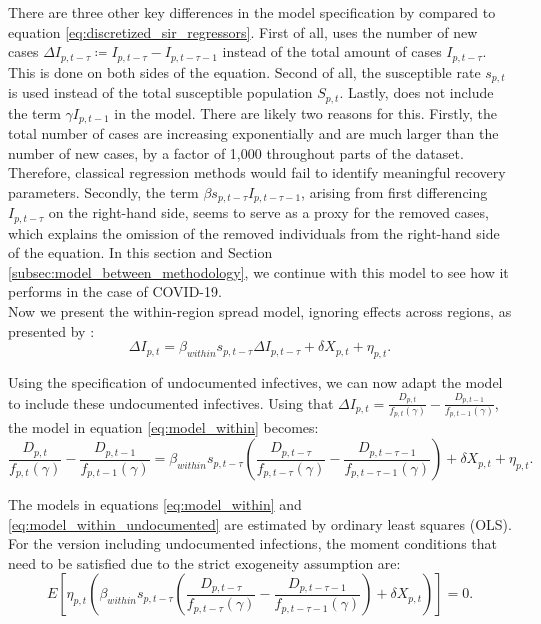 \documentclass[12pt]{article}
\begin{document}
	There are three other key differences in the model specification by \textcite{adda2016economic} compared to equation \eqref{eq:discretized_sir_regressors}. First of all, \textcite{adda2016economic} uses the number of new cases $\Delta I_{p,t-\tau} \coloneqq I_{p,t-\tau} - I_{p,t-\tau-1}$ instead of the total amount of cases $I_{p,t-\tau}$. This is done on both sides of the equation. Second of all, the susceptible rate $s_{p,t}$ is used instead of the total susceptible population $S_{p,t}$. Lastly, \textcite{adda2016economic} does not include the term $\gamma I_{p,t-1}$ in the model. There are likely two reasons for this. Firstly, the total number of cases are increasing exponentially and are much larger than the number of new cases, by a factor of 1,000 throughout parts of the dataset. Therefore, classical regression methods would fail to identify meaningful recovery parameters. Secondly, the term $\beta s_{p,t-\tau} I_{p,t-\tau-1}$, arising from first differencing $I_{p,t-\tau}$ on the right-hand side, seems to serve as a proxy for the removed cases, which explains the omission of the removed individuals from the right-hand side of the equation. In this section and Section \ref{subsec:model_between_methodology}, we continue with this model to see how it performs in the case of COVID-19.
	\\
	
	Now we present the within-region spread model, ignoring effects across regions, as presented by \textcite{adda2016economic}:
	\begin{equation} \label{eq:model_within}
	    \Delta I_{p,t} = \beta_{within} s_{p,t-\tau} \Delta I_{p,t-\tau} + \delta X_{p,t} + \eta_{p,t}.
	\end{equation}
	
	Using the specification of undocumented infectives, we can now adapt the model to include these undocumented infectives. Using that $\Delta I_{p,t} = \frac{D_{p,t}}{f_{p,t}(\gamma)} - \frac{D_{p,t-1}}{f_{p,t-1}(\gamma)}$, the model in equation \eqref{eq:model_within} becomes:
	    \begin{equation} \label{eq:model_within_undocumented}
		    \frac{D_{p,t}}{f_{p,t}(\gamma)} - \frac{D_{p,t-1}}{f_{p,t-1}(\gamma)} = \beta_{within}s_{p,t-\tau}\left(\frac{D_{p,t-\tau}}{f_{p,t-\tau}(\gamma)} - \frac{D_{p,t-\tau-1}}{f_{p,t-\tau-1}(\gamma)}\right) + \delta X_{p,t} + \eta_{p,t}.
	    \end{equation}
	
	The models in equations \eqref{eq:model_within} and \eqref{eq:model_within_undocumented} are estimated by ordinary least squares (OLS). For the version including undocumented infections, the moment conditions that need to be satisfied due to the strict exogeneity assumption are:
	    \[E\left[ \eta_{p,t} \left( \beta_{within}s_{p,t-\tau}\left(\frac{D_{p,t-\tau}}{f_{p,t-\tau}(\gamma)} - \frac{D_{p,t-\tau-1}}{f_{p,t-\tau-1}(\gamma)}\right) + \delta X_{p,t} \right) \right] = 0.\]
	
\end{document}
